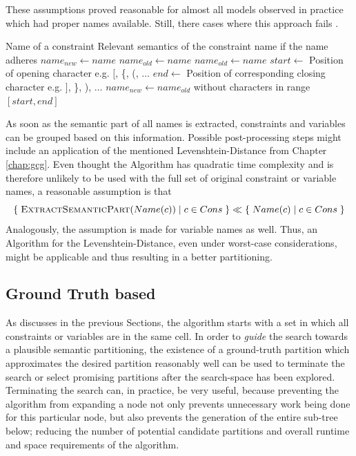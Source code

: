 			These assumptions proved reasonable for almost all models observed in practice which had proper names available. Still, there cases where this approach fails .
		
			\begin{algorithm}[ht!]
				\centering
				\begin{algorithmic}
					\Require Name of a constraint
					\Ensure Relevant semantics of the constraint name if the name adheres 
					\Statex
						\State ${name}_{new} \gets name$
						\State ${name}_{old} \gets name$
						\Repeat
							\State ${name}_{old} \gets name$
							\State $start \gets$ Position of opening character e.g. $\lbrack$, \{, (, $\ldots$
							\State $end \gets$ Position of corresponding closing character e.g. $\rbrack$, \}, ), $\ldots$
							\State ${name}_{new} \gets {name}_{old}$ without characters in range $[start, end]$ 
					\EndFunction
				\end{algorithmic}
				\caption{}
				\label{algo:tree:scoring:nameheur}
			\end{algorithm}
			
			As soon as the semantic part of all names is extracted, constraints and variables can be grouped based on this information.
			Possible post-processing steps might include an application of the mentioned Levenshtein-Distance from Chapter \ref{chap:gcg}.
			Even thought the Algorithm has quadratic time complexity and is therefore unlikely to be used with the full set of original constraint or variable names, a reasonable assumption is that
			\begin{equation*}
				\{ \; \Call{ExtractSemanticPart}{Name(c)} \mid c \in Cons \; \} \ll \{ \; Name(c) \mid c \in Cons \; \}
			\end{equation*}
			Analogously, the assumption is made for variable names as well.
			Thus, an Algorithm for the Levenshtein-Distance, even under worst-case considerations, might be applicable and thus resulting in a better partitioning.
			
			\clearpage
			

		\subsection{Ground Truth based}
		\label{chap:tree:scoring:groundtruth}
		
			As discusses in the previous Sections, the algorithm starts with a set in which all constraints or variables are in the same cell.
			In order to \textit{guide} the search towards a plausible semantic partitioning, the existence of a ground-truth partition which approximates the desired partition reasonably well can be used to terminate the search or select promising partitions after the search-space has been explored.
			Terminating the search can, in practice, be very useful, because preventing the algorithm from expanding a node not only prevents unnecessary work being done for this particular node, but also prevents the generation of the entire sub-tree below; reducing the number of potential candidate partitions and overall runtime and space requirements of the algorithm.
			
